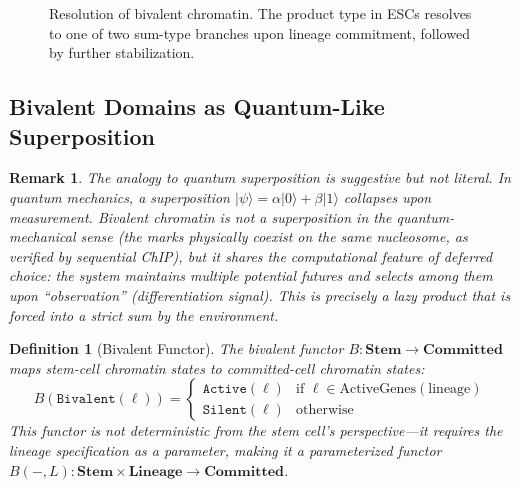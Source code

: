 \documentclass[12pt,a4paper]{article}
\newtheorem{definition}[theorem]{Definition}
\newtheorem{remark}[theorem]{Remark}
\newcommand{\Biv}{\texttt{Bivalent}}
\newcommand{\cat}[1]{\mathbf{#1}}
\begin{document}
\begin{figure}[H]
\centering
{}
\caption{Resolution of bivalent chromatin. The product type in ESCs resolves to one of two sum-type branches upon lineage commitment, followed by further stabilization.}
\label{fig:bivalent-resolve}
\end{figure}

\subsection{Bivalent Domains as Quantum-Like Superposition}

\begin{remark}
The analogy to quantum superposition is suggestive but not literal. In quantum mechanics, a superposition $|\psi\rangle = \alpha|0\rangle + \beta|1\rangle$ collapses upon measurement. Bivalent chromatin is not a superposition in the quantum-mechanical sense (the marks physically coexist on the same nucleosome, as verified by sequential ChIP), but it shares the computational feature of \emph{deferred choice}: the system maintains multiple potential futures and selects among them upon ``observation'' (differentiation signal). This is precisely a \emph{lazy product} that is forced into a \emph{strict sum} by the environment.
\end{remark}

\begin{definition}[Bivalent Functor]
\label{def:biv-functor}
The \emph{bivalent functor} $B : \cat{Stem} \to \cat{Committed}$ maps stem-cell chromatin states to committed-cell chromatin states:
\[
    B(\Biv(\ell)) = \begin{cases}
        \texttt{Active}(\ell) & \text{if } \ell \in \mathrm{ActiveGenes}(\mathrm{lineage}) \\
        \texttt{Silent}(\ell) & \text{otherwise}
    \end{cases}
\]
This functor is not deterministic from the stem cell's perspective---it requires the lineage specification as a parameter, making it a \emph{parameterized} functor $B(-, L) : \cat{Stem} \times \cat{Lineage} \to \cat{Committed}$.
\end{definition}
\end{document}
